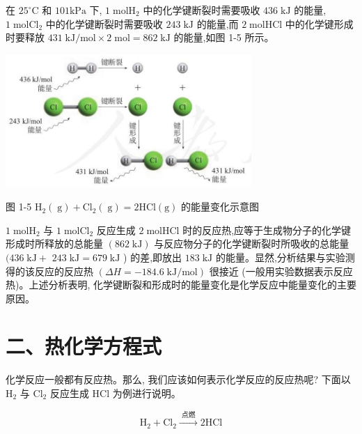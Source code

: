 \documentclass[10pt]{article}
\begin{document}
在 \({25}^{ \circ }\mathrm{C}\) 和 \({101}\mathrm{{kPa}}\) 下, \(1\mathrm{\;{mol}}{\mathrm{H}}_{2}\) 中的化学键断裂时需要吸收 \({436}\mathrm{\;{kJ}}\) 的能量, \(1\mathrm{\;{mol}}{\mathrm{{Cl}}}_{2}\) 中的化学键断裂时需要吸收 \({243}\mathrm{\;{kJ}}\) 的能量,而 \(2\mathrm{\;{mol}}\mathrm{{HCl}}\) 中的化学键形成时要释放 \({431}\mathrm{\;{kJ}}/\mathrm{{mol}} \times 2\mathrm{\;{mol}} = {862}\mathrm{\;{kJ}}\) 的能量,如图 1-5 所示。

\begin{center}
\includegraphics[max width=0.7\textwidth]{images/0190da9d-8bfd-732f-bc2c-0b21d0f13b91_12_422797.jpg}
\end{center}

图 1-5 \({\mathrm{H}}_{2}\left( \mathrm{\;g}\right) + {\mathrm{{Cl}}}_{2}\left( \mathrm{\;g}\right) = 2\mathrm{{HCl}}\left( \mathrm{g}\right)\) 的能量变化示意图

\(1\mathrm{\;{mol}}{\mathrm{H}}_{2}\) 与 \(1\mathrm{\;{mol}}{\mathrm{{Cl}}}_{2}\) 反应生成 \(2\mathrm{\;{mol}}\mathrm{{HCl}}\) 时的反应热,应等于生成物分子的化学键形成时所释放的总能量 \(\left( {{862}\mathrm{\;{kJ}}}\right)\) 与反应物分子的化学键断裂时所吸收的总能量 \(({436}\mathrm{\;{kJ}} +\) \({243}\mathrm{\;{kJ}} = {679}\mathrm{\;{kJ}}\) ) 的差,即放出 \({183}\mathrm{\;{kJ}}\) 的能量。显然,分析结果与实验测得的该反应的反应热 \(\left( {{\Delta H} = - {184.6}\mathrm{\;{kJ}}/\mathrm{{mol}}}\right)\) 很接近 (一般用实验数据表示反应热)。上述分析表明, 化学键断裂和形成时的能量变化是化学反应中能量变化的主要原因。

\section*{二、热化学方程式}

化学反应一般都有反应热。那么, 我们应该如何表示化学反应的反应热呢? 下面以 \({\mathrm{H}}_{2}\) 与 \({\mathrm{{Cl}}}_{2}\) 反应生成 \(\mathrm{{HCl}}\) 为例进行说明。

\[
{\mathrm{H}}_{2} + {\mathrm{{Cl}}}_{2}\xrightarrow[]{\text{ 点燃 }}2\mathrm{{HCl}}
\]
\end{document}
